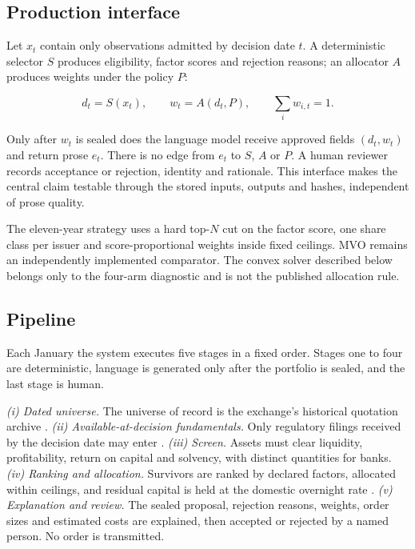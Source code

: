 \documentclass[10pt,conference]{IEEEtran}
\begin{document}
\subsection{Production interface}

Let $x_t$ contain only observations admitted by decision date $t$. A deterministic selector $S$ produces eligibility, factor scores and rejection reasons; an allocator $A$ produces weights under the policy $P$:

\begin{equation}
 d_t=S(x_t),\qquad w_t=A(d_t,P),\qquad \sum_i w_{i,t}=1.
\end{equation}

Only after $w_t$ is sealed does the language model receive approved fields $(d_t,w_t)$ and return prose $e_t$. There is no edge from $e_t$ to $S$, $A$ or $P$. A human reviewer records acceptance or rejection, identity and rationale. This interface makes the central claim testable through the stored inputs, outputs and hashes, independent of prose quality.

The eleven-year strategy uses a hard top-$N$ cut on the factor score, one share class per issuer and score-proportional weights inside fixed ceilings. MVO remains an independently implemented comparator. The convex solver described below belongs only to the four-arm diagnostic and is not the published allocation rule.

\subsection{Pipeline}

Each January the system executes five stages in a fixed order. Stages one to four are deterministic, language is generated only after the portfolio is sealed, and the last stage is human.

\emph{(i) Dated universe.} The universe of record is the exchange's historical quotation archive \cite{b3cotahist}. \emph{(ii) Available-at-decision fundamentals.} Only regulatory filings received by the decision date may enter \cite{cvmitr,cvmdfp}. \emph{(iii) Screen.} Assets must clear liquidity, profitability, return on capital and solvency, with distinct quantities for banks. \emph{(iv) Ranking and allocation.} Survivors are ranked by declared factors, allocated within ceilings, and residual capital is held at the domestic overnight rate \cite{bcb}. \emph{(v) Explanation and review.} The sealed proposal, rejection reasons, weights, order sizes and estimated costs are explained, then accepted or rejected by a named person. No order is transmitted.
\end{document}
